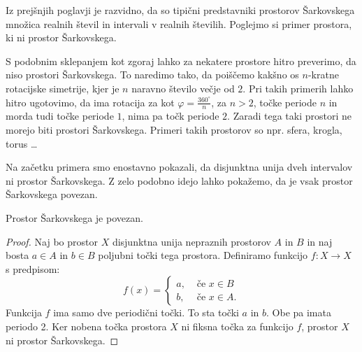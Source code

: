 \documentclass[../TG_magistrsko_delo_sections.tex]{subfiles}
\begin{document}


Iz prejšnjih poglavji je razvidno, da so tipični predstavniki prostorov Šarkovskega množica realnih števil in intervali v realnih številih. Poglejmo si primer prostora, ki ni prostor Šarkovskega.



S podobnim sklepanjem kot zgoraj lahko za nekatere prostore hitro preverimo, da niso prostori Šarkovskega. To naredimo tako, da poiščemo kakšno os $n$-kratne rotacijske simetrije, kjer je $n$ naravno število večje od $2$. Pri takih primerih lahko hitro ugotovimo, da ima rotacija za kot $\varphi = \frac{360^\circ}{n}$, za $n>2$, točke periode $n$ in morda tudi točke periode $1$, nima pa točk periode $2$. Zaradi tega taki prostori ne morejo biti prostori Šarkovskega. Primeri takih prostorov so npr. sfera, krogla, torus \dots 



Na začetku primera smo enostavno pokazali, da disjunktna unija dveh intervalov ni prostor Šarkovskega. Z zelo podobno idejo lahko pokažemo, da je vsak prostor Šarkovskega povezan.


\begin{trditev}
Prostor Šarkovskega je povezan.
\end{trditev}
\begin{proof}
Naj bo prostor $X$ disjunktna unija nepraznih prostorov $A$ in $B$ in naj bosta $a \in A$ in $b \in B$ poljubni točki tega prostora. Definiramo funkcijo $f:X \to X$ s predpisom:
\[ f(x) = \begin{cases}
  a, & \mbox{ če $x \in B $}\\
  b ,& \mbox{ če $x \in A$.}
  \end{cases}
  \]
Funkcija $f$ ima samo dve periodični točki. To sta točki $a$ in $b$. Obe pa imata periodo 2. Ker nobena točka prostora $X$ ni fiksna točka za funkcijo $f$, prostor $X$ ni prostor Šarkovskega.
\end{proof}
\end{document}
